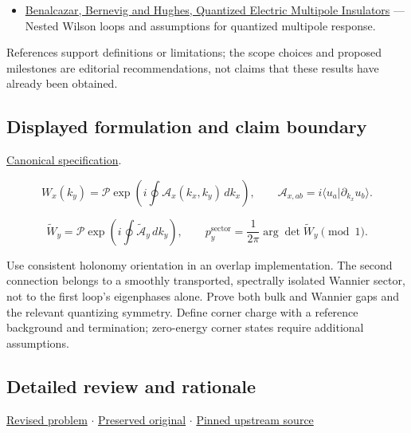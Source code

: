 \documentclass[
  11pt,
]{article}
\providecommand{\tightlist}{%
  \setlength{\itemsep}{0pt}\setlength{\parskip}{0pt}}
\begin{document}
\begin{itemize}
\tightlist
\item
  \href{https://arxiv.org/abs/1611.07987}{Benalcazar, Bernevig and
  Hughes, Quantized Electric Multipole Insulators} --- Nested Wilson
  loops and assumptions for quantized multipole response.
\end{itemize}

References support definitions or limitations; the scope choices and
proposed milestones are editorial recommendations, not claims that these
results have already been obtained.

\subsection{Displayed formulation and claim boundary}

\href{https://github.com/rick-stevens-ai/Pure-Thought/blob/main/PRDs/13-Higher-Order-Topological-Insulators.md}{Canonical
specification}.

\[W_x(k_y)=\mathcal P\exp\!\left(i\oint\mathcal A_x(k_x,k_y)\,dk_x\right),
\qquad \mathcal A_{x,ab}=i\langle u_a|\partial_{k_x}u_b\rangle.\]

\[\widetilde W_y=\mathcal P\exp\!\left(i\oint\widetilde{\mathcal A}_y\,dk_y\right),
\qquad p_y^{\mathrm{sector}}=\frac1{2\pi}\arg\det\widetilde W_y\pmod1.\]

Use consistent holonomy orientation in an overlap implementation. The
second connection belongs to a smoothly transported, spectrally isolated
Wannier sector, not to the first loop's eigenphases alone. Prove both
bulk and Wannier gaps and the relevant quantizing symmetry. Define
corner charge with a reference background and termination; zero-energy
corner states require additional assumptions.

\subsection{Detailed review and rationale}

\href{https://github.com/rick-stevens-ai/Pure-Thought/blob/main/PRDs/13-Higher-Order-Topological-Insulators.md}{Revised
problem} \ensuremath{\cdot}
\href{https://github.com/rick-stevens-ai/Pure-Thought/blob/main/archive/original-PRDs/13-Higher-Order-Topological-Insulators.md}{Preserved
original} \ensuremath{\cdot}
\href{https://github.com/rick-stevens-ai/Pure-Thought/blob/f854d4e12b55c1f5b5c2a964b75f2d23496d981e/PRDs/13-Higher-Order-Topological-Insulators.md}{Pinned
upstream source}
\end{document}
